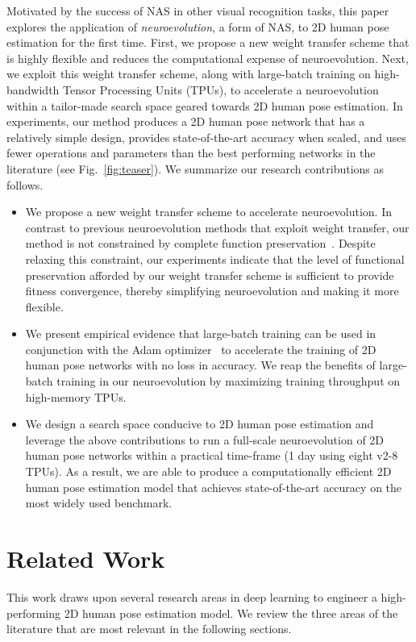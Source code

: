 \documentclass[final]{cvpr}
\begin{document}
Motivated by the success of NAS in other visual recognition tasks, this paper explores the application of \textit{neuroevolution}, a form of NAS, to 2D human pose estimation for the first time. First, we propose a new weight transfer scheme that is highly flexible and reduces the computational expense of neuroevolution. Next, we exploit this weight transfer scheme, along with large-batch training on high-bandwidth Tensor Processing Units (TPUs), to accelerate a neuroevolution within a tailor-made search space geared towards 2D human pose estimation. In experiments, our method produces a 2D human pose network that has a relatively simple design,  provides state-of-the-art accuracy when scaled, and uses fewer operations and parameters than the best performing networks in the literature (see Fig.\ \ref{fig:teaser}). We summarize our research contributions as follows.
\vspace{-2pt}
\begin{itemize}
    \item We propose a new weight transfer scheme to accelerate neuroevolution. In contrast to previous neuroevolution methods that exploit weight transfer, our method is not constrained by complete function preservation~\cite{wistuba2018deep, wei2016network}. Despite relaxing this constraint, our experiments indicate that the level of functional preservation afforded by our weight transfer scheme is sufficient to provide fitness convergence, thereby simplifying neuroevolution and making it more flexible.
    \item We present empirical evidence that large-batch training can be used in conjunction with the Adam optimizer~\cite{kingma2014adam} to accelerate the training of 2D human pose networks with no loss in accuracy. We reap the benefits of large-batch training in our neuroevolution by maximizing training throughput on high-memory TPUs.
    \item We design a search space conducive to 2D human pose estimation and leverage the above contributions to run a full-scale neuroevolution of 2D human pose networks within a practical time-frame (1 day using eight v2-8 TPUs). As a result, we are able to produce a computationally efficient 2D human pose estimation model that achieves state-of-the-art accuracy on the most widely used benchmark. 
\end{itemize}


\section{Related Work}
This work draws upon several research areas in deep learning to engineer a high-performing 2D human pose estimation model. We review the three areas of the literature that are most relevant in the following sections.
\end{document}
